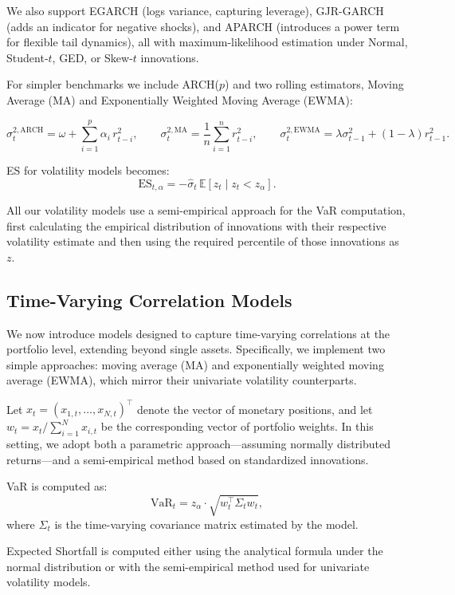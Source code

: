 \documentclass{article}
\begin{document}
We also support EGARCH (logs variance, capturing leverage), GJR-GARCH (adds an indicator for negative shocks), and APARCH (introduces a power term for flexible tail dynamics), all with maximum-likelihood estimation under Normal, Student‐\( t \), GED, or Skew-\( t \) innovations.

For simpler benchmarks we include ARCH(\( p \)) and two rolling estimators, Moving Average (MA) and Exponentially Weighted Moving Average (EWMA):

\[
\sigma_{t}^{2,\mathrm{ARCH}}=\omega+\sum_{i=1}^{p} \alpha_{i}\, r_{t-i}^{2},\qquad
\sigma_{t}^{2,\mathrm{MA}}=\frac{1}{n}\sum_{i=1}^{n} r_{t-i}^{2},\qquad
\sigma_{t}^{2,\mathrm{EWMA}}=\lambda \sigma_{t-1}^{2}+(1-\lambda) r_{t-1}^{2}.
\]

ES for volatility models becomes:
\[
  \text{ES}_{t,\alpha} = -\hat{\sigma}_t \, \mathbb{E}[z_t \mid z_t < z_\alpha].
\] 

All our volatility models use a semi-empirical approach for the VaR computation, first calculating the empirical distribution of innovations with their respective volatility estimate and then using the required percentile of those innovations as \( z \).


\subsection{Time-Varying Correlation Models}

We now introduce models designed to capture time-varying correlations at the portfolio level, extending beyond single assets. Specifically, we implement two simple approaches: moving average (MA) and exponentially weighted moving average (EWMA), which mirror their univariate volatility counterparts.

Let \( x_t = (x_{1,t}, \dots, x_{N,t})^\top \) denote the vector of monetary positions, and let \( w_t = x_t / \sum_{i=1}^N x_{i,t} \) be the corresponding vector of portfolio weights. In this setting, we adopt both a parametric approach—assuming normally distributed returns—and a semi-empirical method based on standardized innovations.

VaR is computed as:
\[
\text{VaR}_t = z_\alpha \cdot \sqrt{w_t^\top \Sigma_t w_t},
\]
where \( \Sigma_t \) is the time-varying covariance matrix estimated by the model.

Expected Shortfall is computed either using the analytical formula under the normal distribution or with the semi-empirical method used for univariate volatility models.
\end{document}
